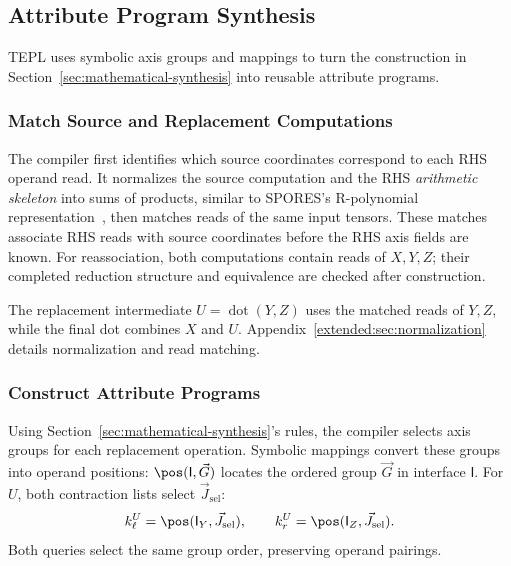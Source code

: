 \subsection{Attribute Program Synthesis}
\label{sec:synthesis}
TEPL uses symbolic axis groups and mappings to turn the construction in
Section~\ref{sec:mathematical-synthesis} into reusable attribute programs.


\subsubsection{Match Source and Replacement Computations}
\label{sec:normalization}
The compiler first identifies which source coordinates correspond to each
RHS operand read. It normalizes the source computation and the RHS
\emph{arithmetic skeleton} into sums of products, similar to SPORES's
R-polynomial representation~\cite[Section~2.3, Definition~2.4]{spores},
then matches reads of the same input tensors. These matches associate
RHS reads with source coordinates before the RHS axis fields are known.
For reassociation, both computations contain reads of $X,Y,Z$; their
completed reduction structure and equivalence are checked after construction.

The replacement intermediate $U=\operatorname{dot}(Y,Z)$ uses the matched
reads of $Y,Z$, while the final dot combines $X$ and $U$.
Appendix~\ref{extended:sec:normalization} details normalization and read
matching.


\subsubsection{Construct Attribute Programs}
\label{sec:keep-axes}
\label{sec:attribute-construction}
\label{sec:emit-programs}
Using Section~\ref{sec:mathematical-synthesis}'s rules, the compiler selects
axis groups for each replacement operation. Symbolic mappings convert
these groups into operand positions: $\pos(\mathsf I,\vec G)$ locates
the ordered group $\vec G$ in interface $\mathsf I$.
For $U$, both contraction lists select $\vec J_{\mathrm{sel}}$:
\begin{equation}
 k_\ell^U=\pos(\mathsf{I}_Y,\vec J_{\mathrm{sel}}),\qquad
 k_r^U=\pos(\mathsf{I}_Z,\vec J_{\mathrm{sel}}).
 \label{eq:symbolic-contraction-queries}
\end{equation}
Both queries select the same group order, preserving operand pairings.



